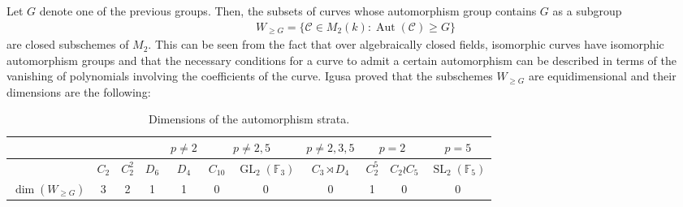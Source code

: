 \documentclass{amsart}
\newcommand{\calC}{\mathcal{C}}
\DeclareMathOperator{\Aut}{Aut}
\newcommand{\Mtwo}{M_2}
\newcommand{\GL}{\operatorname{GL}}
\newcommand{\SL}{\operatorname{SL}}
\numberwithin{equation}{section}
\theoremstyle{definition}
\theoremstyle{remark}
\begin{document}
Let $G$ denote one of the previous groups. Then, the subsets of curves whose automorphism group contains $G$ as a subgroup
\begin{align*}
W_{\geq G}=\{\calC\in \Mtwo(k): \Aut(\calC)\geq G\}
\end{align*}
are closed subschemes of $\Mtwo$. This can be seen from the fact that over algebraically closed fields, isomorphic curves have isomorphic automorphism groups and that the necessary conditions for a curve to admit a certain automorphism can be described in terms of the vanishing of polynomials involving the coefficients of the curve. Igusa proved that the subschemes $W_{\geq G}$ are equidimensional and their dimensions are the following:
\begin{table}[H]
\centering

\begin{tabular}{lccc|c|cc|c|cc|c|}
\cline{5-11}
                                                          &                                                    &                                                              &       & \cellcolor[HTML]{a7c957}$p\neq2$ & \multicolumn{2}{c|}{\cellcolor[HTML]{a7c957}$p\neq 2,5$}                      & \cellcolor[HTML]{a7c957}$p\neq 2,3,5$ & \multicolumn{2}{c|}{\cellcolor[HTML]{a7c957}$p=2$}                  & \cellcolor[HTML]{a7c957}$p=5$ \\ \hline
\rowcolor[HTML]{FFFFFF} 
\multicolumn{1}{|l|}{\cellcolor[HTML]{a7c957}$G$}         & \multicolumn{1}{c|}{\cellcolor[HTML]{ffffff}$C_2$} & \multicolumn{1}{c|}{\cellcolor[HTML]{ffffff}$C_2^2$} & $D_6$ & $D_4$                            & \multicolumn{1}{c|}{\cellcolor[HTML]{ffffff}$C_{10}$} & $\GL_2(\mathbb{F}_3)$ & $C_3\rtimes D_4$                      & \multicolumn{1}{c|}{\cellcolor[HTML]{ffffff}$C_2^5$} & $C_2\wr C_5$ & $\SL_2(\mathbb{F}_5)$         \\ \hline
\multicolumn{1}{|l|}{\cellcolor[HTML]{a7c957}$\dim(W_{\geq G})$} & \multicolumn{1}{c|}{3}                             & \multicolumn{1}{c|}{2}                                       & 1     & 1                                & \multicolumn{1}{c|}{0}                                & 0                     & 0                                     & \multicolumn{1}{c|}{1}                               & 0            & 0                             \\ \hline
\end{tabular}

\caption{Dimensions of the automorphism strata.}

\end{table}
\end{document}
